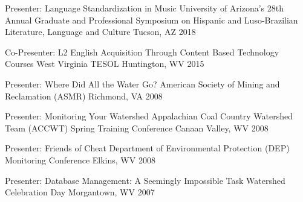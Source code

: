 


\begin{cvhonors}


\cvhonor
{Presenter: Language Standardization in Music} %
{University of Arizona’s 28th Annual Graduate and Professional Symposium on Hispanic and Luso-Brazilian Literature, Language and Culture} %
{Tucson, AZ} %
{2018} %


\cvhonor
{Co-Presenter: L2 English Acquisition Through Content Based Technology Courses} %
{West Virginia TESOL} %
{Huntington, WV} %
{2015} %


\cvhonor
{Presenter: Where Did All the Water Go?} %
{American Society of Mining and Reclamation (ASMR)} %
{Richmond, VA} %
{2008} %


\cvhonor
{Presenter: Monitoring Your Watershed} %
{Appalachian Coal Country Watershed Team (ACCWT) Spring Training Conference} %
{Canaan Valley, WV} %
{2008} %


\cvhonor
{Presenter: Friends of Cheat} %
{Department of Environmental Protection (DEP) Monitoring Conference} %
{Elkins, WV} %
{2008} %


\cvhonor
{Presenter: Database Management: A Seemingly Impossible Task} %
{Watershed Celebration Day} %
{Morgantown, WV} %
{2007} %


\end{cvhonors}

